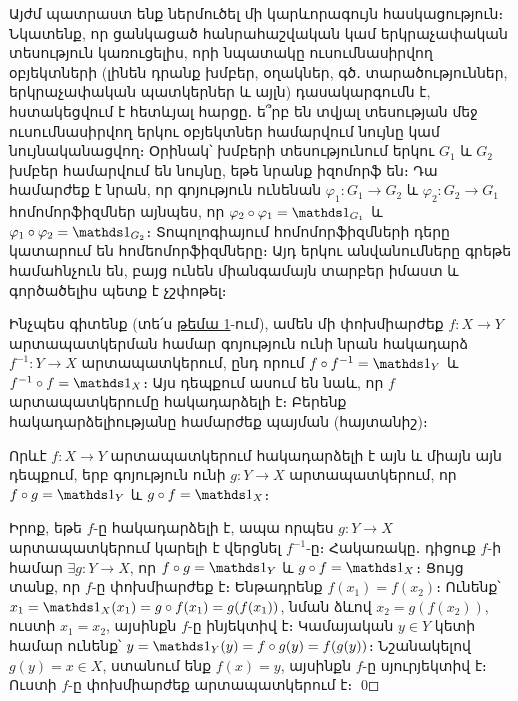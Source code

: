 \documentclass[./main.tex]{subfiles}
\begin{document}
\par Այժմ պատրաստ ենք ներմուծել մի կարևորագույն հասկացություն։ Նկատենք, որ ցանկացած հանրահաշվական կամ երկրաչափական տեսություն կառուցելիս, որի նպատակը ուսումնասիրվող օբյեկտների (լինեն դրանք խմբեր, օղակներ, գծ․ տարածություններ, երկրաչափական պատկերներ և այլն) դասակարգումն է, հստա\-կեց\-վում է հետևյալ հարցը․ ե՞րբ են տվյալ տեսության մեջ ուսումնասիրվող երկու օբյեկտներ համարվում նույնը կամ նույնականացվող։ Օրինակ՝ խմբերի տեսութ\-յու\-նում երկու $G_1$ և $G_2$ խմբեր համարվում են նույնը, եթե նրանք իզոմորֆ են։ Դա համարժեք է նրան, որ գոյություն ունենան ${\varphi_1:G_1\rightarrow G_2}$ և $\varphi_2:G_2\rightarrow G_1$ հոմոմորֆիզմներ այնպես, որ $\varphi_2\circ \varphi_1=\nuynakan_{G_1}$ և $\varphi_1\circ \varphi_2=\nuynakan_{G_2}$։ Տոպոլոգիայում հոմոմորֆիզմների դերը կատարում են հոմեոմորֆիզմները։ Այդ երկու անվանում\-ները գրեթե համահնչուն են, բայց ունեն միանգամայն տարբեր իմաստ և գործածե\-լիս պետք է չշփոթել։

\par Ինչպես գիտենք (տե՛ս \hyperlink{sec:1}{թեմա 1}-ում), ամեն մի փոխմիարժեք $f:X\rightarrow Y$ արտա\-պատ\-կեր\-ման համար գոյություն ունի նրան հակադարձ $f^{-1}:Y\rightarrow X$ ար\-տա\-պատ\-կե\-րում, ընդ որում $f\circ f^{-1}=\nuynakan_Y$ և $f^{-1}\circ f=\nuynakan_X$։ Այս դեպքում ասում են նաև, որ $f$ արտապատկերումը հակադարձելի է։ Բերենք հակադարձելիությանը համարժեք պայման (հայտանիշ)։ 

\par Որևէ $f:X\rightarrow Y$ արտապատկերում հակադարձելի է այն և միայն այն դեպքում, երբ գոյություն ունի $g:Y\rightarrow X$ արտապատկերում, որ $f\circ g=\nuynakan_Y$ և $g\circ f=\nuynakan_X$։
\par Իրոք, եթե $f$-ը հակադարձելի է, ապա որպես $g:Y\rightarrow X$ արտապատկերում կարելի է վերցնել $f^{-1}$-ը։ Հակառակը․ դիցուք $f$-ի համար $\exists g:Y\rightarrow X$, որ $f\circ g=\nuynakan_Y$ և $g\circ f=\nuynakan_X$։ Ցույց տանք, որ $f$-ը փոխմիարժեք է։ Ենթադրենք $f(x_1)=f(x_2)$։ Ունենք՝ $x_1=\nuynakan_X(x_1)=g\circ f(x_1)=g(f(x_1))$, նման ձևով $x_2=g(f(x_2))$, ուստի $x_1=x_2$, այսինքն $f$-ը ինյեկտիվ է։ Կամայական $y\in Y$ կետի համար ունենք՝ $y=\nuynakan_Y(y)=f\circ g(y)=f(g(y))$։ Նշանակելով $g(y)=x\in X$, ստանում ենք $f(x)=y$, այսինքն $f$-ը սյուրյեկտիվ է։ Ուստի $f$-ը փոխմիարժեք արտապատկերում է։ \qed

\end{document}
